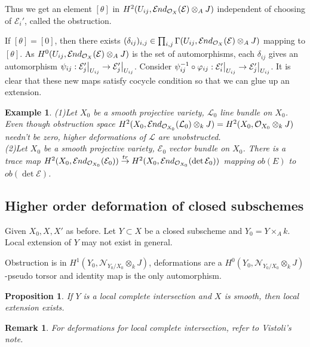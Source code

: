 \documentclass{ctexart}
\newtheorem{remark}{Remark}[section]
\newtheorem{proposition}{Proposition}[section]
\newtheorem{example}{Example}[section]
\newcommand{\sheafend}{\mathcal{E}\kern -.5pt nd}
\begin{document}
Thus we get an element $[\theta]$ in $H^{2}(U_{ij}, \sheafend_{\mathcal{O}_{X}}(\mathcal{E}) \otimes_{A} J)$ independent of choosing of $\mathcal{E}_{i}'$, called the obstruction.
\par
If $[\theta] = [0]$, then there exists $(\delta_{ij})_{i, j}\in \prod_{i, j} \Gamma(U_{ij}, \sheafend_{\mathcal{O}_{X}}(\mathcal{E}) \otimes_{A} J)$ mapping to $[\theta]$.
As $H^{0}(U_{ij}, \sheafend_{\mathcal{O}_{X}}(\mathcal{E}) \otimes_{A} J)$ is the set of automorphisms, each $\delta_{ij}$ gives an automorphism $\psi_{ij}: \mathcal{E}_{j}'\big{|}_{U_{ij}} \rightarrow \mathcal{E}_{j}'\big{|}_{U_{ij}}$.
Consider $\psi_{ij}^{-1} \circ \varphi_{ij}: \mathcal{E}_{i}'\big{|}_{U_{ij}} \rightarrow \mathcal{E}_{j}'\big{|}_{U_{ij}}$.
It is clear that these new maps satisfy cocycle condition so that we can glue up an extension.
\begin{example}
    (1)Let $X_{0}$ be a smooth projective variety, $\mathcal{L}_{0}$ line bundle on $X_{0}$.
    Even though obstruction space $H^{2}(X_{0}, \sheafend_{\mathcal{O}_{X_{0}}}(\mathcal{L}_{0}) \otimes_{k} J) = H^{2}(X_{0}, \mathcal{O}_{X_{0}} \otimes_{k} J)$ needn't be zero,
    higher deformations of $\mathcal{L}$ are unobstructed. \\
    (2)Let $X_{0}$ be a smooth projective variety, $\mathcal{E}_{0}$ vector bundle on $X_{0}$.
    There is a trace map $H^{2}(X_{0}, \sheafend_{\mathcal{O}_{X_{0}}}(\mathcal{E}_{0})) \overset{tr}{\rightarrow} H^{2}(X_{0}, \sheafend_{\mathcal{O}_{X_{0}}}(\det \mathcal{E}_{0}))$ mapping $ob(E)$ to $ob(\det \mathcal{E})$.
\end{example}

\subsection{Higher order deformation of closed subschemes}
\label{subsection:Obstruction_Theory_higher_order_deformation_of_closed_subschemes}

Given $X_{0}, X, X'$ as before.
Let $Y \subset X$ be a closed subscheme and $Y_{0} = Y \times_A k$.
Local extension of $Y$ may not exist in general.
\par
Obstruction is in $H^{1}(Y_{0}, \mathcal{N}_{Y_{0}/X_{0}} \otimes_{k} J)$, 
deformations are a $H^{0}(Y_{0}, \mathcal{N}_{Y_{0}/X_{0}} \otimes_{k} J)$-pseudo torsor and identity map is the only automorphism.
\begin{proposition}
    If $Y$ is a local complete intersection and $X$ is smooth,
    then local extension exists.
    \label{Proposition 2.1}
\end{proposition}
\begin{remark}
    For deformations for local complete intersection, refer to Vistoli's note.
\end{remark}
\end{document}
